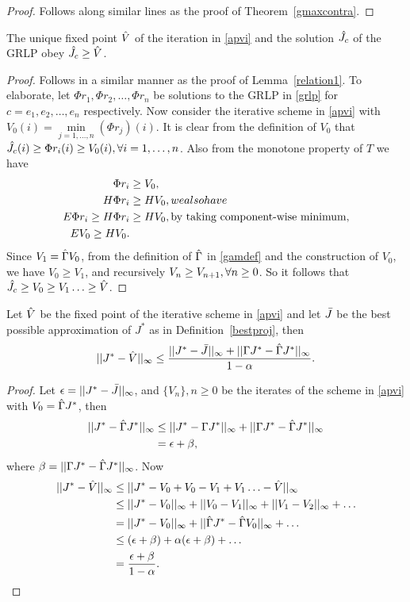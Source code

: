 \begin{proof}
Follows along similar lines as the proof of Theorem~\ref{gmaxcontra}.
\end{proof}
\begin{lemma}\label{relation2}
The unique fixed point $\hat{V}$ of the iteration in \eqref{apvi} and the solution $\hat{J}_c$ of the GRLP obey $\hat{J}_c\geq\hat{V}$.
\end{lemma}
\begin{proof}
Follows in a similar manner as the proof of Lemma~\ref{relation1}. To elaborate, let $\Phi r_1, \Phi r_2,\ldots,\Phi r_n$ be solutions to the GRLP in \eqref{grlp} for $c=e_1, e_2,\ldots,e_n$ respectively. Now consider the iterative scheme in \eqref{apvi} with $V_0(i)=\underset{j=1,\ldots,n}{\min}(\Phi r_j)(i)$. It is clear from the definition of $V_0$ that $\hat{J}_c(i)\geq\Phi r_i(i)\geq V_0(i), \relax{ } \forall i=1,\ldots,n$. Also from the monotone property of $T$ we have 
\begin{align}
\Phi r_i&\geq V_0,\nonumber\\
H\Phi r_i&\geq H V_0,\relax{we also have}\nonumber\\
E\Phi r_i\geq H\Phi r_i&\geq HV_0,\relax{ }\text{by taking component-wise minimum},\nonumber\\
E V_0\geq H V_0.
\end{align}
Since $V_1=\hat{\Gamma} V_0$, from the definition of $\hat{\Gamma}$ in \eqref{gamdef} and the construction of $V_0$, we have $V_0\geq V_1$, and recursively $V_{n}\geq V_{n+1}, \relax{ }\forall n\geq 0$. So it follows that $\hat{J}_c\geq V_0\geq V_1\ldots\geq \hat{V}$.
\end{proof}
\begin{theorem}\label{mt1}
Let $\hat{V}$ be the fixed point of the iterative scheme in \eqref{apvi} and let $\bar{J}$ be the best possible approximation of $J^*$ as in Definition~\ref{bestproj}, then
\begin{align}
||J^*-\hat{V}||_\infty\leq \frac{||J^*-\bar{J}||_\infty+||\Gamma J^*-\hat{\Gamma} J^*||_\infty}{1-\alpha}.
\end{align}
\end{theorem}
\begin{proof}
Let $\epsilon=||J^*-\bar{J}||_\infty$, and $\{V_n\},n\geq 0$ be the iterates of the scheme in \eqref{apvi} with $V_0=\hat{\Gamma} J^*$, then
\begin{align}
||J^*-\hg J^*||_\infty&\leq||J^*-\Gamma J^*||_\infty+||\Gamma J^*-\hg J^*||_\infty\nn\\\vspace{10pt}
&= \epsilon+\beta,
\end{align}
where $\beta=||\Gamma J^*-\hat{\Gamma} J^*||_\infty$. Now
\begin{align}
||J^*-\hv||_\infty&\leq ||J^*-V_0+V_0-V_1+V_1\ldots-\hv||_\infty\nn\\
&\leq ||J^*-V_0||_\infty+||V_0-V_1||_\infty+||V_1-V_2||_\infty+\ldots\nn\\
&=||J^*-V_0||_\infty+||\hg J^*-\hg V_0||_\infty+\ldots\nn\\\vspace{10pt}
&\leq (\epsilon+\beta)+\alpha(\epsilon+\beta)+\ldots\nn\\
&=\frac{\epsilon+\beta}{1-\alpha}.
\end{align}
\end{proof}

